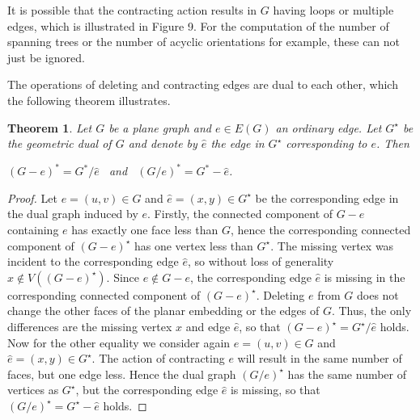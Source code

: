 \documentclass[12pt,a4paper, twoside, autooneside=false]{scrartcl}
\newtheorem{theorem}{Theorem}[section]
\theoremstyle{definition}
\theoremstyle{remark}
\numberwithin{equation}{section}
\begin{document}
It is possible that the contracting action results in $G$ having loops or multiple edges, which is illustrated in Figure 9. For the computation of the number of spanning trees or the number of acyclic orientations for example, these can not just be ignored. 
\begin{center}
\label{fig:label}
\end{center}
The operations of deleting and contracting edges are dual to each other, which the following theorem illustrates.
\begin{theorem}
Let $G$ be a plane graph and $e \in E(G)$ an ordinary edge. Let $G^\star$ be the geometric dual of $G$ and denote by $\hat{e}$ the edge in $G^\star$ corresponding to $e$. Then 
\begin{center}
$(G - e)^* = G^* / \hat{e}$ \ and \ $(G / e)^* = G^* - \hat{e}$.
\end{center}
\end{theorem}
\begin{proof}
Let $e = (u,v) \in G$ and $\hat{e} = (x,y) \in G^\star$ be the corresponding edge in the dual graph induced by $e$. Firstly, the connected component of $G - e$ containing $e$ has exactly one face less than $G$, hence the corresponding connected component of $(G - e)^\star$ has one vertex less than $G^\star$. The missing vertex was incident to the corresponding edge $\hat{e}$, so without loss of generality $x \not \in V((G - e)^\star)$. Since $e \not \in G - e$, the corresponding edge $\hat{e}$ is missing in the corresponding connected component of $(G - e)^\star$. Deleting $e$ from $G$ does not change the other faces of the planar embedding or the edges of $G$. Thus, the only differences are the missing vertex $x$ and edge $\hat{e}$, so that $(G - e)^\star = G^\star / \hat{e}$ holds. \\ 
\indent Now for the other equality we consider again $e = (u,v) \in G$ and $\hat{e} = (x,y) \in G^\star$. The action of contracting $e$ will result in the same number of faces, but one edge less. Hence the dual graph $(G / e)^\star$ has the same number of vertices as $G^\star$, but the corresponding edge $\hat{e}$ is missing, so that $(G / e)^\star = G^\star - \hat{e}$ holds.
\end{proof}
\end{document}
